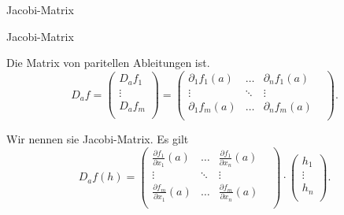 \documentclass[class=article, crop=false]{standalone}
\begin{document}
\begin{zettel}{Jacobi-Matrix}
\begin{flashcard}{Jacobi-Matrix}
	\begin{definition}
		Die Matrix von paritellen Ableitungen ist.
		\[
			D_a f = \begin{pmatrix}
				D_a f_1 \\
				\vdots  \\
				D_a f_m \\
			\end{pmatrix}
			=
			\begin{pmatrix}
				\partial_1 f_1 (a) & \dots  & \partial _n f_1 (a)   \\
				\vdots             & \ddots & \vdots              & \\
				\partial_1 f_m (a) & \dots  & \partial_n f_m (a)    \\
			\end{pmatrix}
		.\]

		Wir nennen sie Jacobi-Matrix. Es gilt
		\[
			D_a f (h)=
			\begin{pmatrix}
				\frac{ \partial f_{1}}{\partial x_1} (a) & \dots  & \frac{ \partial f_{1}}{\partial x_n} (a)   \\
				\vdots                                   & \ddots & \vdots                                   & \\
				\frac{\partial f_{m}}{\partial x_1} (a)  & \dots  & \frac{\partial f_{m}}{\partial x_n} (a)    \\
			\end{pmatrix} \cdot
			\begin{pmatrix}
				h_1    \\
				\vdots \\
				h_n    \\
			\end{pmatrix}
		.\]
	\end{definition}

\end{flashcard}
\end{zettel}
\end{document}
